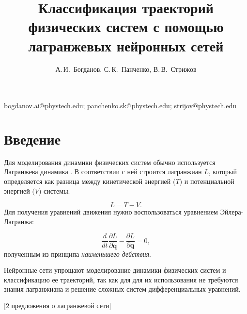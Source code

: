 \documentclass[12pt, twoside]{article}
\begin{document}
\title
    {Классификация траекторий физических систем с помощью лагранжевых нейронных сетей}
\author
    {А.\,И.~Богданов, С.\,К.~Панченко, В.\,В.~Стрижов} 
\email
    {bogdanov.ai@phystech.edu; panchenko.sk@phystech.edu; strijov@phystech.edu}

\maketitle

\section{Введение}
 
    Для моделирования динамики физических систем обычно используется Лагранжева динамика \cite{landau1976mechanics}. В соответствии с ней строится лагранжиан $L$, который определяется как разница между кинетической энергией ($T$) и потенциальной энергией ($V$) системы:

    $$L = T - V.$$
    Для получения уравнений движения нужно воспользоваться уравнением Эйлера-Лагранжа:

    $$\frac{d}{dt} \frac{\partial L}{\partial \dot{\mathbf{q}}} - \frac{\partial L}{\partial \mathbf{q}} = 0,$$
    полученным из принципа \emph{наименьшего действия}.

    Нейронные сети упрощают моделирование динамики физических систем и классификацию ее траекторий, так как для для их использования не требуются знания лагранжиана и решение сложных систем дифференциальных уравнений. 

    [2 предложения о лагранжевой сети]
    
\end{document}
